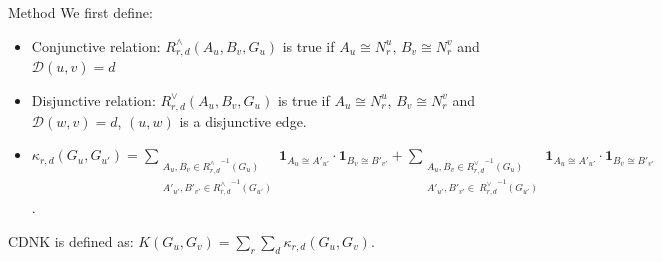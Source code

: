 \documentclass{beamer}
\begin{document}
\begin{frame}{Method}
We first define:
\begin{itemize}
	\item Conjunctive relation: $R_{r,d}^\wedge(A_u, B_v, G_u)$ is true if $A_u \cong N_r^u$, $B_v \cong N_r^v$ and $\mathcal{D}(u,v) = d$ \vspace{.3em}
	\item Disjunctive relation: $R_{r,d}^\vee(A_u, B_v, G_u)$ is true if $A_u \cong N_r^u$, $B_v \cong N_r^v$ and $\mathcal{D}(w,v) = d$, $(u,w)$ is a disjunctive edge. \vspace{.3em}
	\item  $\kappa_{r,d}(G_u,G_{u'}) = \!\!\!\!\!\!\!\!\!\!\!\!
 \sum\limits_{\substack {A_u,{B}_{v} \in {R_{r,d}^{\wedge}}^{ -1}(G_u) \\ A'_{u'},{B'}_{v'} \in {R_{r,d}^{\wedge}}^{ -1}(G_{u'}) }} \!\!\!\!\!\!\!\!\!\!\!\!
  { \textbf{1}_{A_u \cong A'_{u'}} \cdot { \textbf{1}_{B_{v} \cong B'_{v'}}}}
+ \!\!\!\!\!\!\!\!\!\!\!\!
 \sum\limits_{\substack {A_u,{B}_{v} \in {R_{r,d}^{\vee}}^{ -1}(G_u) \\
  A'_{u'},{B'}_{v'} \in \ {R_{r,d}^{\vee}}^{ -1}(G_{u'}) }} \!\!\!\!\!\!\!\!\!\!\!\!
  { \textbf{1}_{A_u \cong A'_{u'}} \cdot { \textbf{1}_{B_{v} \cong B'_{v'}}}}
  $.
\end{itemize}
CDNK is defined as:
$K(G_u,G_v) = \sum\limits_{r}{\sum\limits_{d}{\kappa_{r,d}(G_u,G_v)}}$.

\end{frame}
\end{document}
